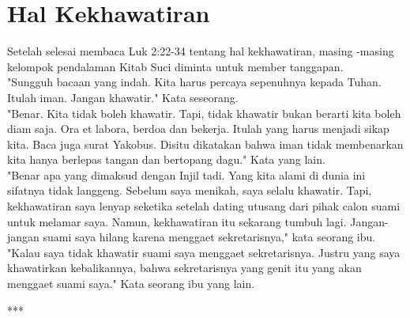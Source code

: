 \section*{Hal Kekhawatiran}

Setelah selesai membaca Luk 2:22-34 tentang hal kekhawatiran, masing -masing kelompok pendalaman Kitab Suci diminta untuk member tanggapan.\\
"Sungguh bacaan yang indah. Kita harus percaya sepenuhnya kepada Tuhan. Itulah iman. Jangan khawatir." Kata seseorang.\\
"Benar. Kita tidak boleh khawatir. Tapi, tidak khawatir bukan berarti kita boleh diam saja. Ora et labora, berdoa dan bekerja. Itulah yang harus menjadi sikap kita. Baca juga surat Yakobus. Disitu dikatakan bahwa iman tidak membenarkan kita hanya berlepas tangan dan bertopang dagu." Kata yang lain.\\
"Benar apa yang dimaksud dengan Injil tadi. Yang kita alami di dunia ini sifatnya tidak langgeng. Sebelum saya menikah, saya selalu khawatir. Tapi, kekhawatiran saya lenyap seketika setelah dating utusang dari pihak calon suami untuk melamar saya. Namun, kekhawatiran itu sekarang tumbuh lagi. Jangan-jangan suami saya hilang karena menggaet sekretarisnya," kata seorang ibu.\\
"Kalau saya tidak khawatir suami saya menggaet sekretarisnya. Justru yang saya khawatirkan kebalikannya, bahwa sekretarisnya yang genit itu yang akan menggaet suami saya." Kata seorang ibu yang lain.

\begin{center} ***\end{center}

